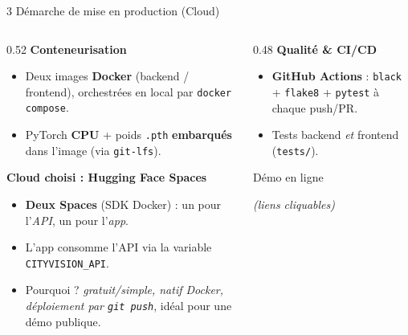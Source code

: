 \documentclass[aspectratio=169,11pt]{beamer}
\newcommand{\emphc}[1]{\textbf{\color{cvblue}#1}}
\newcommand{\code}[1]{\texttt{\small #1}}
\begin{document}
\begin{frame}{3 \textbar{} Démarche de mise en production (Cloud)}
  \begin{columns}[T]
    \begin{column}{0.52\textwidth}
      \textbf{Conteneurisation}
      \begin{itemize}\footnotesize
        \item Deux images \emphc{Docker} (backend / frontend), orchestrées en local
          par \code{docker compose}.
        \item PyTorch \emphc{CPU} + poids \code{.pth} \emphc{embarqués} dans l'image
          (via \code{git-lfs}).
      \end{itemize}
      \vspace{0.3em}
      \textbf{Cloud choisi : \emphc{Hugging Face Spaces}}
      \begin{itemize}\footnotesize
        \item \emphc{Deux Spaces} (SDK Docker) : un pour l'\emph{API}, un pour l'\emph{app}.
        \item L'app consomme l'API via la variable \code{CITYVISION\_API}.
        \item Pourquoi ? \emph{gratuit/simple, natif Docker, déploiement par \code{git push}},
          idéal pour une démo publique.
      \end{itemize}
    \end{column}
    \begin{column}{0.48\textwidth}
      \textbf{Qualité \& CI/CD}
      \begin{itemize}\footnotesize
        \item \emphc{GitHub Actions} : \code{black} + \code{flake8} + \code{pytest}
          à chaque push/PR.
        \item Tests backend \emph{et} frontend (\code{tests/}).
      \end{itemize}
      \vspace{0.4em}
      \begin{block}{\small Démo en ligne \faLink}
        \centering\footnotesize
        \href{https://huggingface.co/spaces/DaryaEL/cityvision}{%
          }\\[4pt]
        \href{https://daryael-cityvision-api.hf.space/docs}{%
          }
      \end{block}
      {\scriptsize\centering\textit{(liens cliquables)}\par}
    \end{column}
  \end{columns}
\end{frame}
\end{document}
